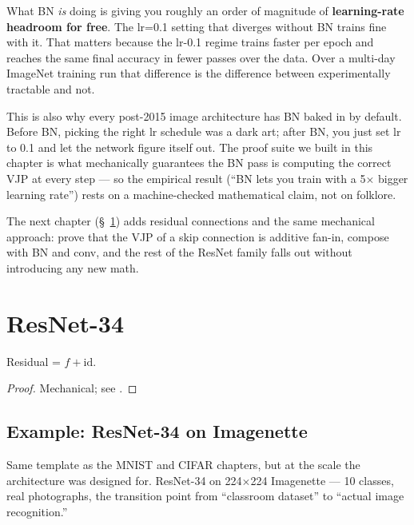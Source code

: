 What BN \emph{is} doing is giving you roughly an order of magnitude
of \textbf{learning-rate headroom for free}. The lr=0.1 setting
that diverges without BN trains fine with it. That matters because
the lr-0.1 regime trains faster per epoch and reaches the same
final accuracy in fewer passes over the data. Over a multi-day
ImageNet training run that difference is the difference between
experimentally tractable and not.

This is also why every post-2015 image architecture has BN baked
in by default. Before BN, picking the right lr schedule was a dark
art; after BN, you just set lr to 0.1 and let the network figure
itself out. The proof suite we built in this chapter is what
mechanically guarantees the BN pass is computing the correct VJP
at every step --- so the empirical result (``BN lets you train with
a 5$\times$ bigger learning rate'') rests on a machine-checked
mathematical claim, not on folklore.

The next chapter (\S~\ref{chap:residual}) adds residual connections
and the same mechanical approach: prove that the VJP of a skip
connection is additive fan-in, compose with BN and conv, and the
rest of the ResNet family falls out without introducing any new
math.

\chapter{ResNet-34}
\label{chap:residual}

\begin{theorem}
  \label{thm:residual_has_vjp}
  \leanok
  Residual = \(f + \mathrm{id}\).
\end{theorem}

\begin{proof}
\leanok
Mechanical; see .
\end{proof}

\section{Example: ResNet-34 on Imagenette}
\label{sec:residual_r34_example}

Same template as the MNIST and CIFAR chapters, but at the scale the
architecture was designed for. ResNet-34 on 224$\times$224
Imagenette --- 10 classes, real photographs, the transition point
from ``classroom dataset'' to ``actual image recognition.''

